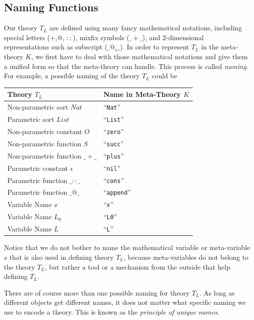 \documentclass[UTF8,11pt]{article}
\theoremstyle{plain}
\theoremstyle{definition}
\theoremstyle{remark}
\newcommand{\Nat}{\textit{Nat}}
\newcommand{\List}{\textit{List}}
\newcommand{\qquottt}[1]{\textrm{``\texttt{#1}''}}
\begin{document}
\subsection{Naming Functions}
Our theory $T_L$ are defined using many fancy mathematical notations, including
special letters ($+$,$@$, $::$), mixfix symbols ($\_+\_$), and 2-dimensional 
representations such as subscript ($\_@_s\_$).
In order to represent $T_L$ in the meta-theory $K$, we first have to deal with 
those mathematical notations and give them a unified form so that the 
meta-theory can handle. 
This process is called \emph{naming}.
For example, a possible naming of the theory $T_L$ could be
\begin{center}
	\begin{tabular}{l|l}
		\textbf{Theory $T_L$} & \textbf{Name in Meta-Theory $K$}
		\\\hline
		Non-parametric sort $\Nat$ & \qquottt{Nat}
		\\\hline
		Parametric sort $\List$ & \qquottt{List}
		\\\hline
		Non-parametric constant $O$ & \qquottt{zero}
		\\\hline
		Non-parametric function $S$ & \qquottt{succ}
		\\\hline
		Non-parametric function $\_+\_$ & \qquottt{plus}
		\\\hline
		Parametric constant $\epsilon$ & \qquottt{nil}
		\\\hline
		Parametric function $\_::\_$ & \qquottt{cons}
		\\\hline
	    Parametric function $\_@\_$ & \qquottt{append}
	    \\\hline
	    Variable Name $x$ & \qquottt{x}
	    \\\hline
	    Variable Name $L_0$ & \qquottt{L0}
	    \\\hline
	    Variable Name $L$ & \qquottt{L}
	\end{tabular}
	\label{tab:naming}
\end{center}
Notice that we do not bother to name the mathematical variable or meta-variable 
$s$ that is also used in defining theory $T_L$, because meta-variables do not 
belong to the theory $T_L$, but rather a tool or a mechanism from the 
outside that help defining $T_L$.

There are of course more than one possible naming for theory $T_L$.
As long as different objects get different names, it does not matter what 
specific naming we use to encode a theory.
This is known as the \emph{principle of unique names}.
\end{document}
